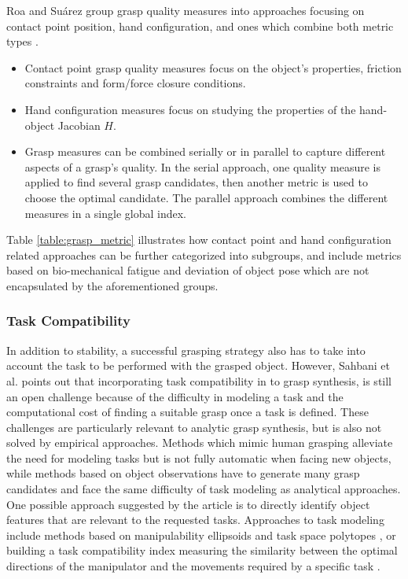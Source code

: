 \documentclass[12pt]{article}
\begin{document}
    Roa and Su{\'a}rez group grasp quality measures into approaches focusing on contact point position, hand configuration, and ones which combine both metric types \cite{Roa2015}.
    \begin{itemize}
        \item Contact point grasp quality measures focus on the object's properties, friction constraints and form/force closure conditions.
        \item Hand configuration measures focus on studying the properties of the hand-object Jacobian $H$.
        \item Grasp measures can be combined serially or in parallel to capture different aspects of a grasp's quality. In the serial approach, one quality measure is applied to find several grasp candidates, then another metric is used to choose the optimal candidate. The parallel approach combines the different measures in a single global index.
    \end{itemize}
    Table \ref{table:grasp_metric} illustrates how contact point and hand configuration related approaches can be further categorized into subgroups, and include metrics based on bio-mechanical fatigue and deviation of object pose which are not encapsulated by the aforementioned groups.


    \subsubsection{Task Compatibility}
    In addition to stability, a successful grasping strategy also has to take into account the task to be performed with the grasped object. However, Sahbani et al. \cite{Sahbani2012} points out that incorporating task compatibility in to grasp synthesis, is still an open challenge because of the difficulty in modeling a task and the computational cost of finding a suitable grasp once a task is defined. These challenges are particularly relevant to analytic grasp synthesis, but is also not solved by empirical approaches. Methods which mimic human grasping alleviate the need for modeling tasks but is not fully automatic when facing new objects, while methods based on object observations have to generate many grasp candidates and face the same difficulty of task modeling as analytical approaches. One possible approach suggested by the article is to directly identify object features that are relevant to the requested tasks. Approaches to task modeling include methods based on manipulability ellipsoids \cite{Yoshikawa1990} and task space polytopes \cite{lee1997}, or building a task compatibility index measuring the similarity between the optimal directions of the manipulator and the movements required by a specific task \cite{chiu1988}.
\end{document}
